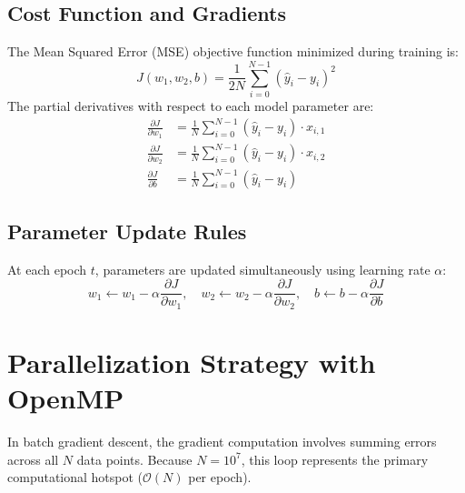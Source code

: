 \documentclass[12pt]{article}
\begin{document}
\subsection{Cost Function and Gradients}
The Mean Squared Error (MSE) objective function minimized during training is:
\begin{equation}
J(w_1, w_2, b) = \frac{1}{2N} \sum_{i=0}^{N-1} \left( \hat{y}_i - y_i \right)^2
\end{equation}
The partial derivatives with respect to each model parameter are:
\begin{align}
\frac{\partial J}{\partial w_1} &= \frac{1}{N} \sum_{i=0}^{N-1} (\hat{y}_i - y_i) \cdot x_{i,1} \\
\frac{\partial J}{\partial w_2} &= \frac{1}{N} \sum_{i=0}^{N-1} (\hat{y}_i - y_i) \cdot x_{i,2} \\
\frac{\partial J}{\partial b}   &= \frac{1}{N} \sum_{i=0}^{N-1} (\hat{y}_i - y_i)
\end{align}

\subsection{Parameter Update Rules}
At each epoch $t$, parameters are updated simultaneously using learning rate $\alpha$:
\begin{equation}
w_1 \leftarrow w_1 - \alpha \frac{\partial J}{\partial w_1}, \quad 
w_2 \leftarrow w_2 - \alpha \frac{\partial J}{\partial w_2}, \quad 
b \leftarrow b - \alpha \frac{\partial J}{\partial b}
\end{equation}

\section{Parallelization Strategy with OpenMP}
In batch gradient descent, the gradient computation involves summing errors across all $N$ data points. Because $N = 10^7$, this loop represents the primary computational hotspot ($\mathcal{O}(N)$ per epoch).
\end{document}
